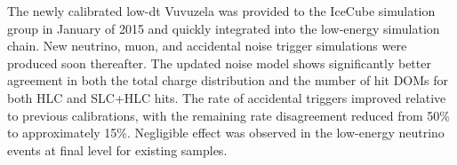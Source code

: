 The newly calibrated low-dt Vuvuzela was provided to the IceCube simulation group in January of 2015 and quickly integrated into the low-energy simulation chain.
New neutrino, muon, and accidental noise trigger simulations were produced soon thereafter.
The updated noise model shows significantly better agreement in both the total charge distribution and the number of hit DOMs for both HLC and SLC+HLC hits.
The rate of accidental triggers improved relative to previous calibrations, with the remaining rate disagreement reduced from 50\% to approximately 15\%.
Negligible effect was observed in the low-energy neutrino events at final level for existing samples.

